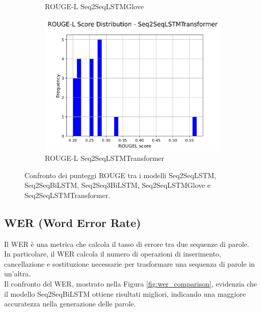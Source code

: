 \begin{figure}[H]
\begin{subfigure}{0.24\textwidth}
        \caption{ROUGE-L Seq2SeqLSTMGlove}
    \end{subfigure}
    \hfill
    \begin{subfigure}{0.24\textwidth}
        \centering
        \includegraphics[width=\textwidth]{media/Seq2SeqLSTMTransformer_rougeL_scores.png}
        \caption{ROUGE-L Seq2SeqLSTMTransformer}
    \end{subfigure}

    \caption{Confronto dei punteggi ROUGE tra i modelli Seq2SeqLSTM, Seq2SeqBiLSTM, Seq2Seq3BiLSTM, Seq2SeqLSTMGlove e Seq2SeqLSTMTransformer.}
    \label{fig:rouge_comparison}
\end{figure}

\subsection{WER (Word Error Rate)}
Il WER \`e una metrica che calcola il tasso di errore tra due sequenze di parole.\\
In particolare, il WER calcola il numero di operazioni di inserimento, cancellazione e sostituzione necessarie per trasformare una sequenza di parole in un'altra.\\

Il confronto del WER, mostrato nella Figura \ref{fig:wer_comparison}, evidenzia che il modello Seq2SeqBiLSTM ottiene risultati migliori, indicando una maggiore accuratezza nella generazione delle parole.

